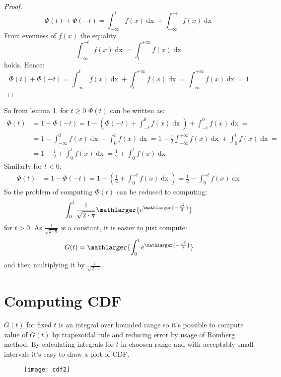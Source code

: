 \documentclass[11pt,wide]{article}
\begin{document}
\begin{proof}
\begin{equation}
\displaystyle \Phi (t) + \Phi (-t) = \int_{-\infty}^t f(x) \mathop{dx} + \int_{-\infty}^{-t} f(x) \mathop{dx}
\end{equation}
From evenness of $f(x)$ the equality
\begin{equation}
\displaystyle \int_{-\infty}^{-t} f(x) \mathop{dx} = \int_{t}^{+\infty} f(x) \mathop{dx}
\end{equation}
holds. Hence:
\begin{equation}
\displaystyle \Phi (t) + \Phi (-t) = \int_{-\infty}^t f(x) \mathop{dx} + \int_{t}^{+\infty} f(x) \mathop{dx} =  \int_{-\infty}^{+\infty} f(x) \mathop{dx} = 1
\end{equation}
\end{proof}
So from lemma 1. for $t\geq 0$ $\Phi (t)$ can be written as:
\begin{align}
\displaystyle \Phi (t) &= 1 - \Phi (-t) = 1 - \left(\Phi (-t) + \int_{-t}^0 f(x) \mathop{dx} \right) +  \int_{-t}^0 f(x) \mathop{dx} = \\
  &= 1 - \int_{-\infty}^0 f(x) \mathop{dx} + \int_{0}^{t} f(x)\mathop{dx} = 1 - \frac{1}{2} \int_{-\infty}^{+\infty} f(x)\mathop{dx} + \int_{0}^{t} f(x)\mathop{dx} = \\
  &= 1 - \frac{1}{2} + \int_{0}^{t} f(x)\mathop{dx} = \frac{1}{2} + \int_{0}^{t} f(x)\mathop{dx}
\end{align}
Similarly for $t<0$:
\begin{align}
\displaystyle \Phi (t) &= 1 - \Phi (-t) = 1 - \left(\frac{1}{2} + \int_{0}^{-t} f(x) \mathop{dx} \right) = \frac{1}{2} - \int_{0}^{-t} f(x) \mathop{dx}
\end{align}
So the problem of computing $\Phi (t)$ can be reduced to computing:
\begin{equation}
\displaystyle \int_0^t \frac{1}{\sqrt{2 \cdot \pi}} \mathlarger{e^{\mathlarger{-\frac{x^2}{2}}}}
\end{equation}
for $t>0$. As $\frac{1}{\sqrt{2 \cdot \pi}}$ is a constant, it is easier to just compute:
\begin{equation}
\displaystyle G(t) = \mathlarger{\int_0^t e^{\mathlarger{-\frac{x^2}{2}}}}
\end{equation}
and then multiplying it by $\frac{1}{\sqrt{2 \cdot \pi}}$.


\section{Computing CDF}
$G(t)$ for fixed $t$ is an integral over bounded range so it's possible to compute value of $G(t)$ by trapezoidal rule and reducing error by usage of Romberg method. By calculating integrals for $t$ in choosen range and with acceptably small intervals it's easy to draw a plot of CDF.

\begin{figure}[h!]
	\texttt{[image: cdf2]}
\end{figure}
\end{document}
